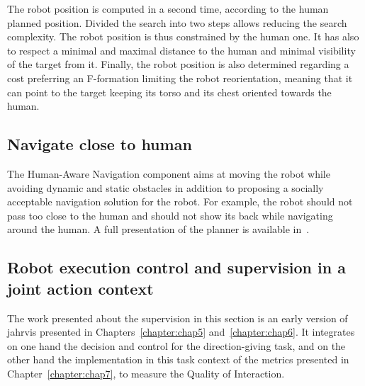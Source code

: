 \documentclass[a4paper,11pt,twoside]{StyleThese}
\begin{document}
The robot position is computed in a second time, according to the human planned position. Divided the search into two steps allows reducing the search complexity. The robot position is thus constrained by the human one. It has also to respect a minimal and maximal distance to the human and minimal visibility of the target from it. Finally, the robot position is also determined regarding a cost preferring an F-formation limiting the robot reorientation, meaning that it can point to the target keeping its torso and its chest oriented towards the human.


\subsection{Navigate close to human}\label{subsec:navigation}

The Human-Aware Navigation component aims at moving the robot while avoiding dynamic and static obstacles in addition to proposing a socially acceptable navigation solution for the robot. For example, the robot should not pass too close to the human and should not show its back while navigating around the human. A full presentation of the planner is available in~\citep{singamaneni_2020_hateb}.

\subsection{Robot execution control and supervision in a joint action context}\label{subsec:supervision}

The work presented about the supervision in this section is an early version of \acrfull{jahrvis} presented in Chapters~\ref{chapter:chap5} and~\ref{chapter:chap6}. It integrates on one hand the decision and control for the direction-giving task, and on the other hand the implementation in this task context of the metrics presented in Chapter~\ref{chapter:chap7}, to measure the Quality of Interaction.
\end{document}
